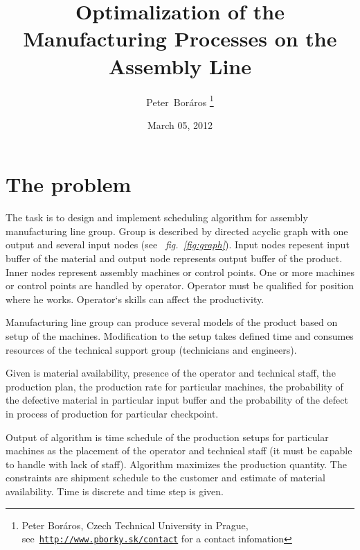 \documentclass[a4paper,journal,twocolumn]{IEEEtran}
\begin{document}
\title{Optimalization of the Manufacturing Processes on the Assembly Line}
\date{March 05, 2012}
\author{Peter~Boráros %
\thanks{{Peter Boráros}, Czech Technical University in Prague,
see~\href{http://www.pborky.sk/contact}{\scriptsize{\texttt{http://www.pborky.sk/contact}}} for a contact infomation}}%




\maketitle
\IEEEdisplaynotcompsoctitleabstractindextext
\IEEEpeerreviewmaketitle

\section{The problem}\label{ass}
The task is to design and implement scheduling algorithm for assembly manufacturing line group.
Group is described by directed acyclic graph with one output and several input nodes (see
~\emph{fig.~\ref{fig:graph}}). Input nodes repesent input buffer of the material and output node represents
output buffer of the product. Inner nodes represent assembly machines or control points.
One or more machines or control points are handled by operator. Operator must be qualified for 
position where he works. Operator`s skills can affect the productivity.

Manufacturing line group can produce several models of the product based on setup of the 
machines. Modification to the setup takes defined time and consumes resources of the
technical support group (technicians and engineers).

Given is material availability, presence of the operator and technical staff, the production plan,
the production rate for particular machines, the probability of the defective material in 
particular input buffer and the probability of the defect in process of production for particular
checkpoint.

Output of algorithm is time schedule of the production setups for particular machines as the 
placement of the operator and technical staff (it must be capable to handle with lack of staff).
Algorithm maximizes the production quantity. The constraints are shipment schedule to
the customer and estimate of material availability. Time is discrete and time step is given.
\end{document}
